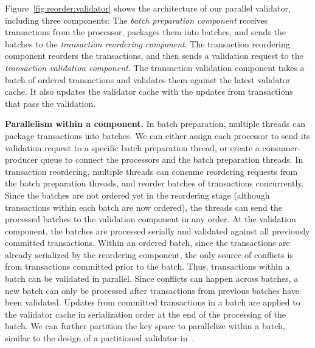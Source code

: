 Figure~\ref{fig:reorder:validator} shows the architecture of our parallel validator, including three components: 
The \emph{batch preparation component} receives transactions from the processor, packages them into batches, and sends the batches to the \emph{transaction reordering component}. The transaction reordering component reorders the transactions, and then sends a validation request to the \emph{transaction validation component}. The transaction validation component takes a batch of ordered 
transactions
and validates them against the latest validator cache. It also updates the validator cache with the updates from transactions that pass the validation. 

{\bf Parallelism within a component.}
In batch preparation, multiple threads can package transactions into batches. We can either assign each processor to send its validation request to a specific batch preparation thread, or create a consumer-producer queue to connect the processors and the batch preparation threads. In transaction reordering, multiple threads can consume reordering requests from the batch preparation threads, and reorder batches of transactions concurrently. Since the batches are not ordered yet in the reordering stage (although transactions within each batch are now ordered), the threads can send the processed batches to the validation component in any order. At the validation component, the batches are processed serially and validated against all previously committed transactions. 
Within an ordered batch, since the transactions are already serialized by the reordering component, the only source of conflicts is from  transactions committed prior to the batch. Thus, transactions within a batch can be validated in parallel. Since conflicts can happen across batches, a new batch can only be processed after transactions from previous batches have been validated. Updates from committed transactions in a batch are applied to the validator cache in serialization order at the end of the processing of the batch. We can further partition the key space to parallelize within a batch, similar to the design of a partitioned validator in~\cite{ding2015centiman}.


